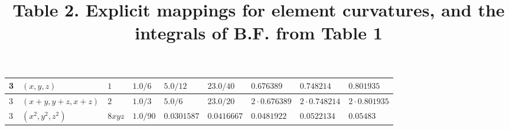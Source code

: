 \begin{landscape}
\begin{center}
\begin{tabular}{ | l | l | l | l | l | l | l | l | l |}
  3 & $(x,y,z)$            & $1$ & $1.0/6$ & $5.0/12$ & $23.0/40$ & $0.676389$ & $0.748214$ & $0.801935$ \\ \hline
  3 & $(x+y,y+z,x+z)$      & $2$ & $1.0/3$ & $5.0/6$ & $23.0/20$ & $2\cdot 0.676389$ & $2\cdot 0.748214$ & $2\cdot 0.801935$ \\ \hline
  3 & $(x^2,y^2,z^2)$      & $8xyz$ & $1.0/90$ & $0.0301587$ & $0.0416667$ & $0.0481922$ & $0.0522134$ & $0.05483$ \\ \hline
\end{tabular} \vfill
\title{Table 2. Explicit mappings for element curvatures, and the integrals of B.F. from Table 1}
\end{center}

\end{landscape}